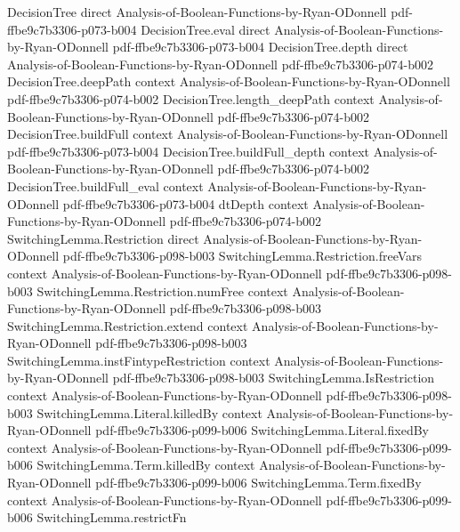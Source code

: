 \begin{lemma}
  {DecisionTree}
  {direct}
  {Analysis-of-Boolean-Functions-by-Ryan-ODonnell}
  {pdf-ffbe9c7b3306-p073-b004}
\proofstep
  {DecisionTree.eval}
  {direct}
  {Analysis-of-Boolean-Functions-by-Ryan-ODonnell}
  {pdf-ffbe9c7b3306-p073-b004}
\proofstep
  {DecisionTree.depth}
  {direct}
  {Analysis-of-Boolean-Functions-by-Ryan-ODonnell}
  {pdf-ffbe9c7b3306-p074-b002}
\proofstep
  {DecisionTree.deepPath}
  {context}
  {Analysis-of-Boolean-Functions-by-Ryan-ODonnell}
  {pdf-ffbe9c7b3306-p074-b002}
\proofstep
  {DecisionTree.length_deepPath}
  {context}
  {Analysis-of-Boolean-Functions-by-Ryan-ODonnell}
  {pdf-ffbe9c7b3306-p074-b002}
\proofstep
  {DecisionTree.buildFull}
  {context}
  {Analysis-of-Boolean-Functions-by-Ryan-ODonnell}
  {pdf-ffbe9c7b3306-p073-b004}
\proofstep
  {DecisionTree.buildFull_depth}
  {context}
  {Analysis-of-Boolean-Functions-by-Ryan-ODonnell}
  {pdf-ffbe9c7b3306-p074-b002}
\proofstep
  {DecisionTree.buildFull_eval}
  {context}
  {Analysis-of-Boolean-Functions-by-Ryan-ODonnell}
  {pdf-ffbe9c7b3306-p073-b004}
\proofstep
  {dtDepth}
  {context}
  {Analysis-of-Boolean-Functions-by-Ryan-ODonnell}
  {pdf-ffbe9c7b3306-p074-b002}
\proofstep
  {SwitchingLemma.Restriction}
  {direct}
  {Analysis-of-Boolean-Functions-by-Ryan-ODonnell}
  {pdf-ffbe9c7b3306-p098-b003}
\proofstep
  {SwitchingLemma.Restriction.freeVars}
  {context}
  {Analysis-of-Boolean-Functions-by-Ryan-ODonnell}
  {pdf-ffbe9c7b3306-p098-b003}
\proofstep
  {SwitchingLemma.Restriction.numFree}
  {context}
  {Analysis-of-Boolean-Functions-by-Ryan-ODonnell}
  {pdf-ffbe9c7b3306-p098-b003}
\proofstep
  {SwitchingLemma.Restriction.extend}
  {context}
  {Analysis-of-Boolean-Functions-by-Ryan-ODonnell}
  {pdf-ffbe9c7b3306-p098-b003}
\proofstep
  {SwitchingLemma.instFintypeRestriction}
  {context}
  {Analysis-of-Boolean-Functions-by-Ryan-ODonnell}
  {pdf-ffbe9c7b3306-p098-b003}
\proofstep
  {SwitchingLemma.IsRestriction}
  {context}
  {Analysis-of-Boolean-Functions-by-Ryan-ODonnell}
  {pdf-ffbe9c7b3306-p098-b003}
\proofstep
  {SwitchingLemma.Literal.killedBy}
  {context}
  {Analysis-of-Boolean-Functions-by-Ryan-ODonnell}
  {pdf-ffbe9c7b3306-p099-b006}
\proofstep
  {SwitchingLemma.Literal.fixedBy}
  {context}
  {Analysis-of-Boolean-Functions-by-Ryan-ODonnell}
  {pdf-ffbe9c7b3306-p099-b006}
\proofstep
  {SwitchingLemma.Term.killedBy}
  {context}
  {Analysis-of-Boolean-Functions-by-Ryan-ODonnell}
  {pdf-ffbe9c7b3306-p099-b006}
\proofstep
  {SwitchingLemma.Term.fixedBy}
  {context}
  {Analysis-of-Boolean-Functions-by-Ryan-ODonnell}
  {pdf-ffbe9c7b3306-p099-b006}
\proofstep
  {SwitchingLemma.restrictFn}

\end{lemma}
